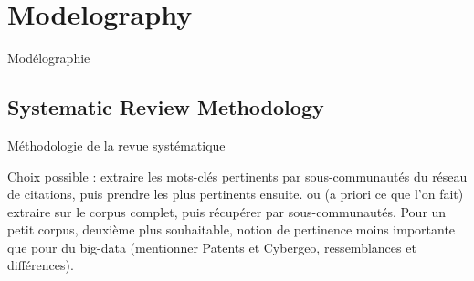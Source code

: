 







\stars






\newpage

\section{Modelography}{Modélographie}

\label{app:sec:modelography}





\subsection{Systematic Review Methodology}{Méthodologie de la revue systématique}


Choix possible : extraire les mots-clés pertinents par sous-communautés du réseau de citations, puis prendre les plus pertinents ensuite.
ou (a priori ce que l'on fait) extraire sur le corpus complet, puis récupérer par sous-communautés. Pour un petit corpus, deuxième plus souhaitable, notion de pertinence moins importante que pour du big-data (mentionner Patents et Cybergeo, ressemblances et différences).












